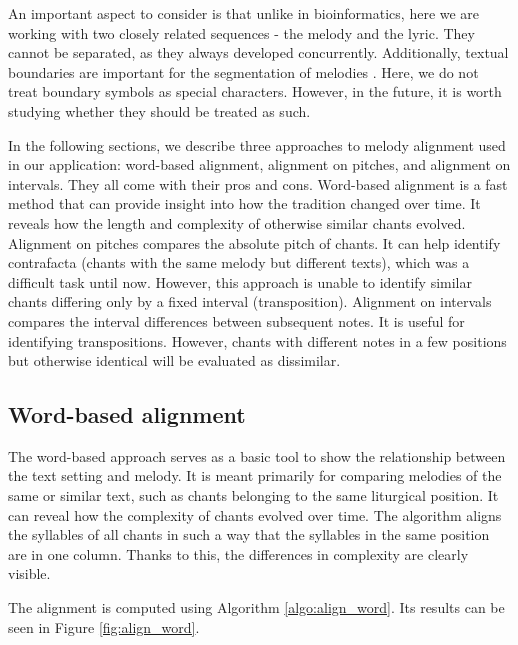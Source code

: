An important aspect to consider is that unlike in bioinformatics, here we are working with two closely related sequences - the melody and the lyric. They cannot
be separated, as they always developed concurrently. Additionally, textual boundaries are important for the segmentation of melodies \citep{chant21}. Here, we
do not treat boundary symbols as special characters. However, in the future, it is worth studying whether they should be treated as such.

In the following sections, we describe three approaches to melody alignment used in our application: word-based alignment, alignment on pitches, and alignment on
intervals. They all come with their pros and cons. Word-based alignment is a fast method that can provide insight into how the tradition changed over time.
It reveals how the length and complexity of otherwise similar chants evolved. Alignment on pitches compares the absolute pitch of chants. It can help identify
contrafacta (chants with the same melody but different texts), which was a difficult task until now. However, this approach is unable to identify similar chants
differing only by a fixed interval (transposition). Alignment on intervals compares the interval differences between subsequent notes. It is useful for identifying
transpositions. However, chants with different notes in a few positions but otherwise identical will be evaluated as dissimilar.

\subsection{Word-based alignment}

The word-based approach serves as a basic tool to show the relationship between the text setting and melody. It is meant primarily for comparing melodies of
the same or similar text, such as chants belonging to the same liturgical position. It can reveal how the complexity of chants evolved over time.
The algorithm aligns the syllables of all chants in such a way that the syllables in the same position are in one column. Thanks to this, the differences
in complexity are clearly visible.

The alignment is computed using Algorithm \ref{algo:align_word}. Its results can be seen in Figure \ref{fig:align_word}.\newline

